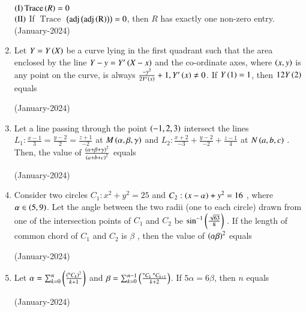 \documentclass[journal]{IEEEtran}
\begin{document}
\begin{enumerate}
 $\left(\text{I}\right) \operatorname{Trace} \left(R\right) = 0$\\
 $\left(\text{II}\right)$ If $\operatorname{Trace}$ $\left(\operatorname{adj}\left(\operatorname{adj\left(R\right)}\right)\right) = 0$, then $R$ has exactly one non-zero entry.
 \hfill(January-2024)
 \begin{enumerate}  
 \end{enumerate}
 \item Let $Y = Y\left(X\right)$
 be a curve lying in the first quadrant such that the area enclosed by the line $Y - y = Y^{\prime}\left(X - x\right)$
 and the co-ordinate axes, where $\left(x,y\right)$
 is any point on the curve, is always $ \frac{-y^2}{2Y^{\prime}\left(x\right)} + 1, Y^{\prime}\left(x\right) \ne 0$. If $Y\left(1\right) = 1$, then $12Y\left(2\right)$
 equals 

 \hfill(January-2024)

 \item Let a line passing through the point $\left(-1,2,3\right)$ intersect the lines $L_1 : \frac{x-1}{3} = \frac{y-2}{2} = \frac{z+1}{-2}$ 
 at $M\left(\alpha, \beta, \gamma\right)$
 and $L_2 : \frac{x+2}{-3} + \frac{y-2}{-2} + \frac{z-1}{4}$ at $N\left(a,b,c\right)$
. Then, the value of $\frac{\left(\alpha+\beta + \gamma\right)^2}{\left(a + b + c\right)^2}$
 equals

 \hfill(January-2024)

 \item Consider two circles $C_1 : x^2 + y^2 = 25$
 and $C_2 : \left(x - \alpha\right) + y^2 = 16$
, where $\alpha \in \left(5,9\right)$. Let the angle between the two radii (one to each circle) drawn from one of the intersection points of $C_1$
 and $C_2$
 be $\sin ^{-1} \left(\frac{\sqrt{63}}{8}\right)$
. If the length of common chord of $C_1$
 and $C_2$
 is $\beta$
, then the value of $\left(\alpha\beta\right)^2$
 equals

 \hfill(January-2024)
 \item Let $\alpha = \sum_{k = 0}^n \left(\frac{\left(^nC_k\right)^2}{k+1}\right)$ and $\beta = \sum_{k = 0}^{n-1} \left(\frac{^nC_k\text{ } ^nC_{k+1}}{k+2}\right)$. If $5\alpha = 6\beta$, then $n$ equals 
 
 \hfill (January-2024)


\end{enumerate}
\end{document}
